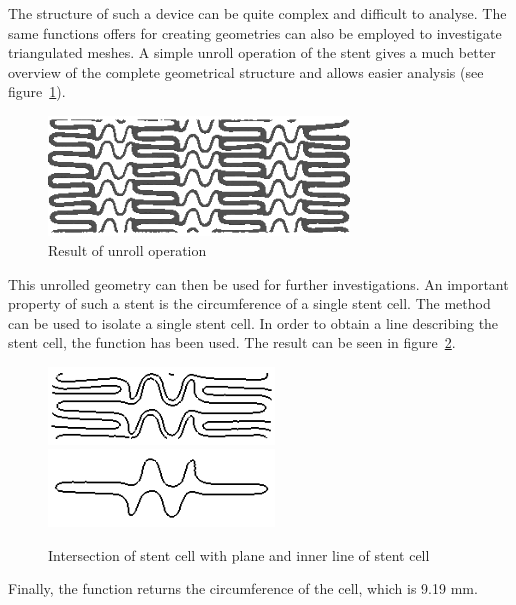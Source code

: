 The structure of such a device can be quite complex and difficult to analyse. The same functions \pyf offers for creating geometries can also be employed to investigate triangulated meshes. A simple unroll operation of the stent gives a much better overview of the complete geometrical structure and allows easier analysis (see figure~\ref{fig:cypher-stent-unroll}).
 

\begin{figure}[ht]
  \centering
  \begin{makeimage}
  \end{makeimage}
  \begin{latexonly}
    \includegraphics[width=8cm]{images/cypher-stent-unroll}
  \end{latexonly}
  \begin{htmlonly}
  \end{htmlonly}  
  \caption{Result of unroll operation}
  \label{fig:cypher-stent-unroll}
\end{figure}

This unrolled geometry can then be used for further investigations. An important property of such a stent is the circumference of a single stent cell. The  method can be used to isolate a single stent cell. In order to obtain a line describing the stent cell, the function  has been used. The result can be seen in figure~\ref{fig:stent-cell}.

\begin{figure}[ht]
  \centering
  \begin{makeimage}
  \end{makeimage}
  \begin{latexonly}
    \includegraphics[width=6cm]{images/stent-cell-full}    
    \includegraphics[width=6cm]{images/stent-cell}
  \end{latexonly}
  \begin{htmlonly}
  \end{htmlonly}  
  \caption{Intersection of stent cell with plane and inner line of stent cell}
  \label{fig:stent-cell}
\end{figure}

Finally, the  function returns the circumference of the cell, which is 9.19 mm.

